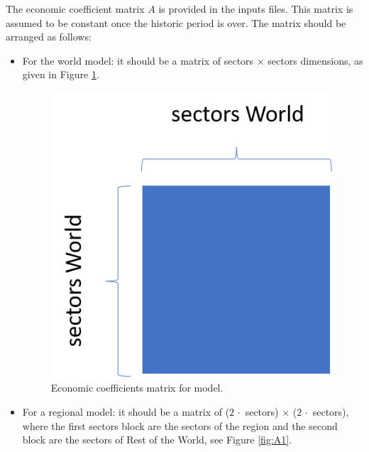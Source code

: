 The economic coefficient matrix $A$ is provided in the inputs files. This matrix is assumed to be constant once the historic period is over. The matrix should be arranged as follows:
\begin{itemize}
    \item For the world model: it should be a matrix of sectors $\times$ sectors dimensions, as given in Figure \ref{fig:A0}.
\begin{figure}[H]
    \centering
    \includegraphics[scale=0.55]{figures/A0.png}
    \caption{Economic coefficients matrix for  model.}
    \label{fig:A0}
\end{figure}
\item For a regional model: it should be a matrix of ($2\,\cdot$ sectors) $\times$ ($2\,\cdot$ sectors), where the first sectors block are the sectors of the region and the second block are the sectors of Rest of the World, see Figure \ref{fig:A1}.
\begin{figure}[H]
    \centering

\end{figure}
\end{itemize}
